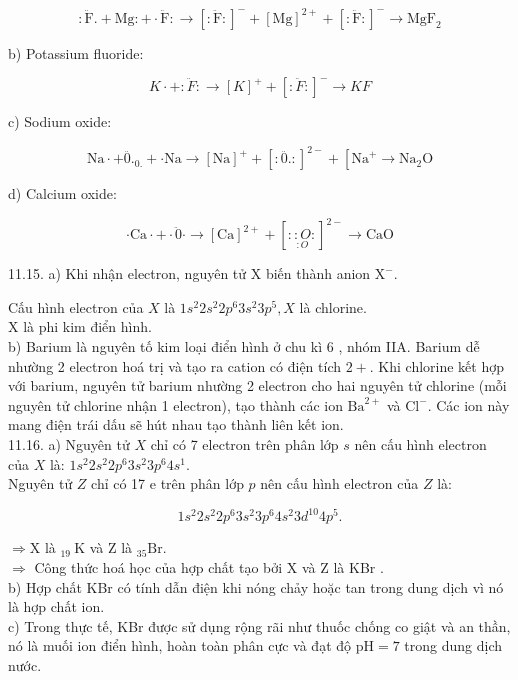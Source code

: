 \documentclass[10pt]{article}
\begin{document}
$$
: \ddot{\mathrm{F}} .+\mathrm{Mg}:+\cdot \ddot{\mathrm{F}}: \rightarrow[: \ddot{\mathrm{F}}:]^{-}+[\mathrm{Mg}]^{2+}+[: \ddot{\mathrm{F}}:]^{-} \rightarrow \mathrm{MgF}_{2}
$$

b) Potassium fluoride:

$$
K \cdot+: \ddot{F}: \rightarrow[K]^{+}+[: \ddot{F}:]^{-} \rightarrow K F
$$

c) Sodium oxide:

$$
\mathrm{Na} \cdot+\ddot{0 .}{ }_{0 .}+\cdot \mathrm{Na} \rightarrow[\mathrm{Na}]^{+}+[: \ddot{0 .}:]^{2-}+\left[\mathrm{Na}^{+} \rightarrow \mathrm{Na}_{2} \mathrm{O}\right.
$$

d) Calcium oxide:

$$
\cdot \mathrm{Ca} \cdot+\cdot \ddot{0} \cdot \rightarrow[\mathrm{Ca}]^{2+}+[: \underset{: O}{: O}:]^{2-} \rightarrow \mathrm{CaO}
$$

11.15. a) Khi nhận electron, nguyên tử X biến thành anion $\mathrm{X}^{-}$.

Cấu hình electron của $X$ là $1 s^{2} 2 s^{2} 2 p^{6} 3 s^{2} 3 p^{5}, X$ là chlorine.\\
X là phi kim điển hình.\\
b) Barium là nguyên tố kim loại điển hình ở chu kì 6 , nhóm IIA. Barium dễ nhường 2 electron hoá trị và tạo ra cation có điện tích $2+$. Khi chlorine kết hợp với barium, nguyên tử barium nhường 2 electron cho hai nguyên tử chlorine (mỗi nguyên tử chlorine nhận 1 electron), tạo thành các ion $\mathrm{Ba}^{2+}$ và $\mathrm{Cl}^{-}$. Các ion này mang điện trái dấu sẽ hút nhau tạo thành liên kết ion.\\
11.16. a) Nguyên tử $X$ chỉ có 7 electron trên phân lớp $s$ nên cấu hình electron của $X$ là: $1 s^{2} 2 s^{2} 2 p^{6} 3 s^{2} 3 p^{6} 4 s^{1}$.\\
Nguyên tử $Z$ chỉ có 17 e trên phân lớp $p$ nên cấu hình electron của $Z$ là:

$$
1 s^{2} 2 s^{2} 2 p^{6} 3 s^{2} 3 p^{6} 4 s^{2} 3 d^{10} 4 p^{5} .
$$

$\Rightarrow \mathrm{X}$ là ${ }_{19} \mathrm{~K}$ và Z là ${ }_{35} \mathrm{Br}$.\\
$\Rightarrow$ Công thức hoá học của hợp chất tạo bởi X và Z là KBr .\\
b) Hợp chất KBr có tính dẫn điện khi nóng chảy hoặc tan trong dung dịch vì nó là hợp chất ion.\\
c) Trong thực tế, KBr được sử dụng rộng rãi như thuốc chống co giật và an thần, nó là muối ion điển hình, hoàn toàn phân cực và đạt độ $\mathrm{pH}=7$ trong dung dịch nước.
\end{document}
